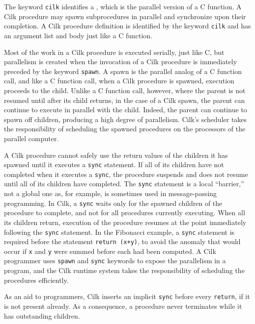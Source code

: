   The keyword
\texttt{cilk} identifies a ,
which is the parallel version of a C function.  A Cilk procedure may
spawn subprocedures in parallel and synchronize upon their completion.
A Cilk procedure definition is identified by the keyword \texttt{cilk}
and has an argument list and body just like a C function.

Most of the work in a Cilk procedure is executed serially, just like
C, but parallelism is created when the invocation of a Cilk procedure
is immediately preceded by the keyword
\texttt{spawn}.  A spawn is the parallel analog of a
C function call, and like a C function call, when a Cilk procedure is
spawned, execution proceeds to the child.  Unlike a C function call,
however, where the parent is not resumed until after its child
returns, in the case of a Cilk spawn, the parent can continue to
execute in parallel with the child.  Indeed, the parent can continue
to spawn off children, producing a high degree of parallelism.  Cilk's
scheduler takes the responsibility of scheduling the spawned
procedures on the processors of the parallel computer.

A Cilk procedure cannot safely use the return values of the children
it has spawned until it executes a \texttt{sync}
statement.  If all of its children have not completed when it executes
a \texttt{sync}, the procedure suspends and does not resume until all
of its children have completed.  The \texttt{sync} statement is a
local ``barrier,'' not a global one as, for example, is
sometimes used in message-passing programming.  In Cilk, a
\texttt{sync} waits only for the spawned children of the procedure to
complete, and not for all procedures currently executing.  When all
its children return, execution of the procedure resumes at the point
immediately following the \texttt{sync} statement.  In the Fibonacci
example, a \texttt{sync} statement is required before the statement
\texttt{return (x+y)}, to avoid the anomaly that would occur if
\texttt{x} and \texttt{y} were summed before each had been computed.
A Cilk programmer uses \texttt{spawn} and \texttt{sync} keywords to
expose the parallelism in a program, and the Cilk runtime system takes
the responsibility of scheduling the procedures efficiently.

As an aid to programmers, Cilk inserts an implicit
\texttt{sync} before every
\texttt{return}, if it is not present already.  As a consequence, a
procedure never terminates while it has outstanding children.

